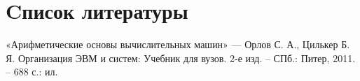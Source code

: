 \documentclass[12pt,onecolumn]{article}
\begin{document}
\section{Cписок литературы}
\begin{thebibliography}{0}
«Арифметические основы вычислительных машин» --- Орлов С. А., Цилькер Б. Я. Организация ЭВМ и систем: Учебник для вузов. 2-е изд. – СПб.: Питер, 2011. – 688 с.: ил.
\end{thebibliography}
\end{document}
